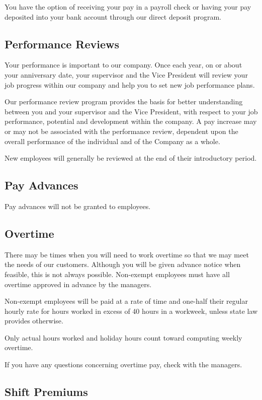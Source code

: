 You have the option of receiving your pay in a payroll check or having your pay deposited into your bank account through our direct deposit program.

\subsection{Performance Reviews}

Your performance is important to our company. Once each year, on or about your anniversary date, your supervisor and the Vice President will review your job progress within our company and help you to set new job performance plans.

Our performance review program provides the basis for better understanding between you and your supervisor and the Vice President, with respect to your job performance, potential and development within the company. A pay increase may or may not be associated with the performance review, dependent upon the overall performance of the individual and of the Company as a whole.

New employees will generally be reviewed at the end of their introductory period.

\subsection{Pay Advances}

Pay advances will not be granted to employees.

\subsection{Overtime}

There may be times when you will need to work overtime so that we may meet the needs of our customers. Although you will be given advance notice when feasible, this is not always possible. Non-exempt employees must have all overtime approved in advance by the managers.

Non-exempt employees will be paid at a rate of time and one-half their regular hourly rate for hours worked in excess of 40 hours in a workweek, unless state law provides otherwise.

Only actual hours worked and holiday hours count toward computing weekly overtime.

If you have any questions concerning overtime pay, check with the managers.

\subsection{Shift Premiums}

